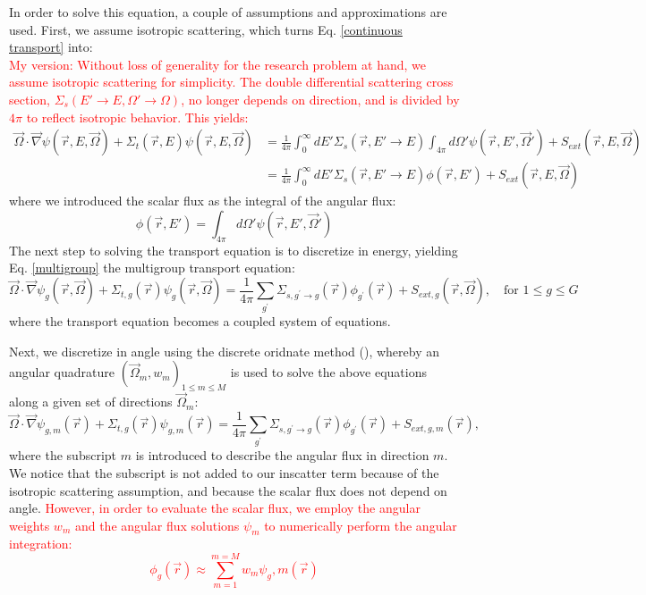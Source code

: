 \documentclass[11pt, letterpaper,titlepage,oneside]{article}
\newcommand{\tcr}[1]{\textcolor{red}{#1}}
\newcommand{\vr}{\vec{r}}
\newcommand{\vo}{\vec{\Omega}}
\begin{document}
In order to solve this equation, a couple of assumptions and approximations are used. First, we assume isotropic scattering, which turns Eq. \ref{continuous transport} into:
\tcr{\\ My version: Without loss of generality for the research problem at hand, we assume isotropic scattering for simplicity. The double differential scattering cross section, $\Sigma_s(E'\to E, \Omega'\to\Omega)$, no longer depends on direction, and is divided by $4\pi$ to reflect isotropic behavior. This yields:}
\begin{align}
\label{isotropic}
\vo \cdot \vec \nabla \psi(\vr,E,\vo) +\Sigma_t(\vr,E) \psi(\vr,E,\vo)  
& = \frac{1}{4\pi}\int_{0}^{\infty}dE' \Sigma_s(\vr,E'\to E) \int_{4\pi}d\Omega' \psi(\vr,E',\vo')  + S_{ext}(\vr,E,\vo) \nonumber \\
& = \frac{1}{4\pi}\int_{0}^{\infty}dE' \Sigma_s(\vr,E'\to E) \phi(\vr,E')  + S_{ext}(\vr,E,\vo) 
\end{align}
where we introduced the scalar flux as the integral of the angular flux:
\begin{equation}
\label{def_scalar_flux}
\phi(\vr,E') = \int_{4\pi}d\Omega' \psi(\vr,E',\vo')
\end{equation}
The next step to solving the transport equation is to discretize in energy, yielding Eq. \ref{multigroup} the multigroup transport equation:
\begin{equation}
\vo \cdot \vec \nabla \psi_g(\vr,\vo) +\Sigma_{t,g}(\vr) \psi_g(\vr,\vo) = \frac{1}{4\pi}\sum_{g^{\prime}}\Sigma_{s,g^{\prime}\to g}(\vr)\phi_{g^{\prime}}(\vr) + S_{ext,g}(\vr,\vo), \quad \text{for } 1 \le g \le G
\label{multigroup}
\end{equation}
where the transport equation becomes a coupled system of equations. 

Next, we discretize in angle using the discrete oridnate method (), whereby an angular quadrature $\left( \vo_m, w_m \right)_{1 \le m \le M}$ is used to solve the above equations along a given set of 
directions $\vo_m$:
\begin{equation}
\vo \cdot \vec \nabla \psi_{g,m}(\vr) +\Sigma_{t,g}(\vr) \psi_{g,m}(\vr)  = \frac{1}{4\pi}\sum_{g^{\prime}}\Sigma_{s,g^{\prime}\to g}(\vr)\phi_{g^{\prime}}(\vr) + S_{ext,g,m}(\vr),
\label{angle}
\end{equation}
where the subscript $m$ is introduced to describe the angular flux in direction $m$. We notice that the subscript is not added to our inscatter term because of the isotropic scattering assumption, and because the scalar flux does not depend on angle. \tcr{However, in order to evaluate the scalar flux, we employ the angular weights $w_m$ and the angular flux solutions
$\psi_m$ to numerically perform the angular integration:
\begin{equation}
\label{def_scalar_flux_2}
\phi_g(\vr) \approx \sum_{m=1}^{m=M} w_m \psi_g,m(\vr)
\end{equation}
}
\end{document}
